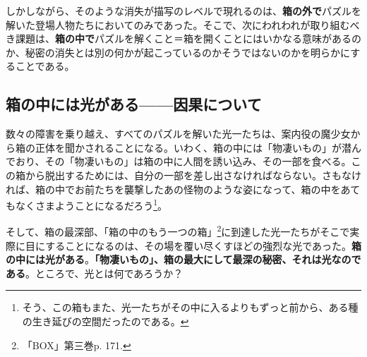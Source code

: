 \documentclass[b5j,twoside,twocolumn]{utarticle}
\begin{document}
しかしながら、そのような消失が描写のレベルで現れるのは、\textbf{箱の外で}パズルを解いた登場人物たちにおいてのみであった。そこで、次にわれわれが取り組むべき課題は、\textbf{箱の中で}パズルを解くこと＝箱を開くことにはいかなる意味があるのか、秘密の消失とは別の何かが起こっているのかそうではないのかを明らかにすることである。

\subsection{\tbaselineshift =3.0pt 箱の中には光がある------因果について}

数々の障害を乗り越え、すべてのパズルを解いた光一たちは、案内役の魔少女から箱の正体を聞かされることになる。いわく、箱の中には「物凄いもの」が潜んでおり、その「物凄いもの」は箱の中に人間を誘い込み、その一部を食べる。この箱から脱出するためには、自分の一部を差し出さなければならない。さもなければ、箱の中でお前たちを襲撃したあの怪物のような姿になって、箱の中をあてもなくさまようことになるだろう\footnote{そう、この箱もまた、光一たちがその中に入るよりもずっと前から、ある種の生き延びの空間だったのである。}。

そして、箱の最深部、「箱の中のもう一つの箱」\footnote{「BOX」第三巻p. 171.}に到達した光一たちがそこで実際に目にすることになるのは、その場を覆い尽くすほどの強烈な光であった。\textbf{箱の中には光がある}。\textbf{「物凄いもの」、箱の最大にして最深の秘密、それは光なのである}。ところで、光とは何であろうか？
\end{document}
